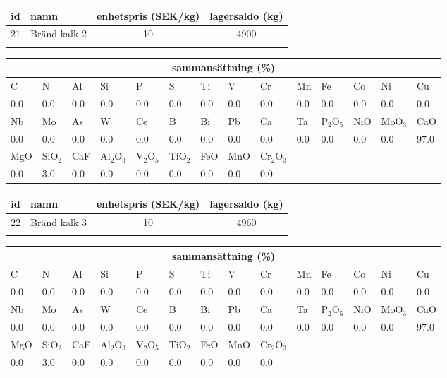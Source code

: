 \begin{center}
{\scriptsize\addtolength{\tabcolsep}{-3pt}
\begin{tabular}{clcc}
id&namn&enhetspris (SEK/kg)&lagersaldo (kg)\\
\hline
21&Bränd kalk 2&10&4900\\\\
\end{tabular}
\begin{tabular}{llllllllllllll}
\multicolumn{14}{c}{sammansättning (\%)}\\
\hline
C&N&Al&Si&P&S&Ti&V&Cr&Mn&Fe&Co&Ni&Cu\\
\hline
0.0&0.0&0.0&0.0& 0.0&0.0&0.0&0.0& 0.0&0.0&0.0&0.0& 0.0&0.0\\
\hline
Nb&Mo&As&W&Ce&B&Bi&Pb&Ca&Ta&P$_2$O$_5$&NiO&MoO$_3$&CaO\\
\hline
0.0& 0.0& 0.0& 0.0& 0.0& 0.0& 0.0& 0.0& 0.0& 0.0& 0.0& 0.0& 0.0& 97.0\\
\hline
MgO&SiO$_2$&CaF&Al$_2$O$_3$&V$_2$O$_5$&TiO$_2$&FeO&MnO&Cr$_2$O$_3$\\
\hline
0.0& 3.0& 0.0& 0.0& 0.0& 0.0& 0.0& 0.0& 0.0\\
\end{tabular}
}
\end{center}

\begin{center}
{\scriptsize\addtolength{\tabcolsep}{-3pt}
\begin{tabular}{clcc}
id&namn&enhetspris (SEK/kg)&lagersaldo (kg)\\
\hline
22&Bränd kalk 3&10&4960\\\\
\end{tabular}
\begin{tabular}{llllllllllllll}
\multicolumn{14}{c}{sammansättning (\%)}\\
\hline
C&N&Al&Si&P&S&Ti&V&Cr&Mn&Fe&Co&Ni&Cu\\
\hline
0.0&0.0&0.0&0.0& 0.0&0.0&0.0&0.0& 0.0&0.0&0.0&0.0& 0.0&0.0\\
\hline
Nb&Mo&As&W&Ce&B&Bi&Pb&Ca&Ta&P$_2$O$_5$&NiO&MoO$_3$&CaO\\
\hline
0.0& 0.0& 0.0& 0.0& 0.0& 0.0& 0.0& 0.0& 0.0& 0.0& 0.0& 0.0& 0.0& 97.0\\
\hline
MgO&SiO$_2$&CaF&Al$_2$O$_3$&V$_2$O$_5$&TiO$_2$&FeO&MnO&Cr$_2$O$_3$\\
\hline
0.0& 3.0& 0.0& 0.0& 0.0& 0.0& 0.0& 0.0& 0.0\\
\end{tabular}
}
\end{center}


